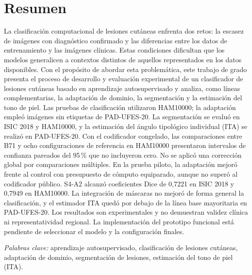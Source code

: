 \chapter*{Resumen}
\noindent
La clasificación computacional de lesiones cutáneas enfrenta dos retos: la escasez de imágenes con diagnóstico confirmado y las diferencias entre los datos de entrenamiento y las imágenes clínicas. Estas condiciones dificultan que los modelos generalicen a contextos distintos de aquellos representados en los datos disponibles. Con el propósito de abordar esta problemática, este trabajo de grado presenta el proceso de desarrollo y evaluación experimental de un clasificador de lesiones cutáneas basado en aprendizaje autosupervisado y analiza, como líneas complementarias, la adaptación de dominio, la segmentación y la estimación del tono de piel. Las pruebas de clasificación utilizaron HAM10000; la adaptación empleó imágenes sin etiquetas de PAD-UFES-20. La segmentación se evaluó en ISIC 2018 y HAM10000, y la estimación del ángulo tipológico individual (ITA) se realizó en PAD-UFES-20. Con el codificador congelado, las comparaciones entre B71 y ocho configuraciones de referencia en HAM10000 presentaron intervalos de confianza pareados del 95\,\% que no incluyeron cero. No se aplicó una corrección global por comparaciones múltiples. En la prueba piloto, la adaptación mejoró frente al control con presupuesto de cómputo equiparado, aunque no superó al codificador público. S4-A2 alcanzó coeficientes Dice de 0,7221 en ISIC 2018 y 0,7949 en HAM10000. La integración de máscaras no mejoró de forma general la clasificación, y el estimador ITA quedó por debajo de la línea base mayoritaria en PAD-UFES-20. Los resultados son experimentales y no demuestran validez clínica ni representatividad regional. La implementación del prototipo funcional está pendiente de seleccionar el modelo y la configuración finales.

\par\smallskip\noindent\hspace*{1.27cm}\textit{Palabras clave:} aprendizaje autosupervisado, clasificación de lesiones cutáneas, adaptación de dominio, segmentación de lesiones, estimación del tono de piel (ITA).\par

